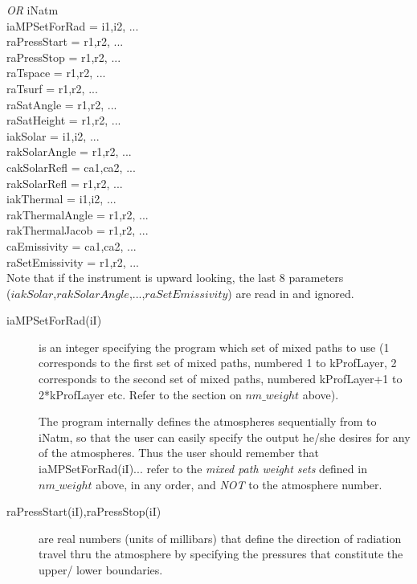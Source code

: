 \documentclass[12pt]{article}
\newcommand{\ttab}{\indent\indent}
\begin{document}
{{\em OR}
\ttab iNatm\\
\ttab iaMPSetForRad   = i1,i2, ...\\
\ttab raPressStart    = r1,r2, ...\\
\ttab raPressStop     = r1,r2, ...\\
\ttab raTspace        = r1,r2, ...\\
\ttab raTsurf         = r1,r2, ...\\
\ttab raSatAngle      = r1,r2, ...\\
\ttab raSatHeight     = r1,r2, ...\\
\ttab iakSolar        = i1,i2, ... \\
\ttab rakSolarAngle   = r1,r2, ...\\
\ttab cakSolarRefl    = ca1,ca2, ...\\
\ttab rakSolarRefl    = r1,r2, ...\\
\ttab iakThermal      = i1,i2, ...\\
\ttab rakThermalAngle = r1,r2, ...\\
\ttab rakThermalJacob = r1,r2, ...\\
\ttab caEmissivity    = ca1,ca2, ...\\
\ttab raSetEmissivity = r1,r2, ...\\

\smallskip\noindent
Note that if the instrument is upward looking, the last 8 parameters \\
($iakSolar$,$rakSolarAngle$,...,$raSetEmissivity$) are read in and ignored.  

\begin{description}

\item[{\sf iaMPSetForRad(iI)}] is an integer specifying the program which set 
of mixed paths to use (1 corresponds to the first set of mixed paths,
numbered 1 to kProfLayer, 2 corresponds to the second set of mixed paths,
numbered kProfLayer+1 to 2*kProfLayer etc.  Refer to the section on 
$nm\_weight$ above).

The program internally defines the atmospheres sequentially 
from {} to {\sf iNatm}, so that the user can easily specify the 
output he/she desires for any of the atmospheres. Thus the user should 
remember that {\sf iaMPSetForRad(iI)...} refer to the {\em mixed path weight 
sets} defined in $nm\_weight$ above, in any order, and {\em NOT} to the 
atmosphere number.

\item[{\sf raPressStart(iI),raPressStop(iI)}] are real numbers (units of 
millibars) that define the direction of radiation travel thru the atmosphere by
specifying the pressures that constitute the upper/ lower boundaries.


\end{description}}
\end{document}
